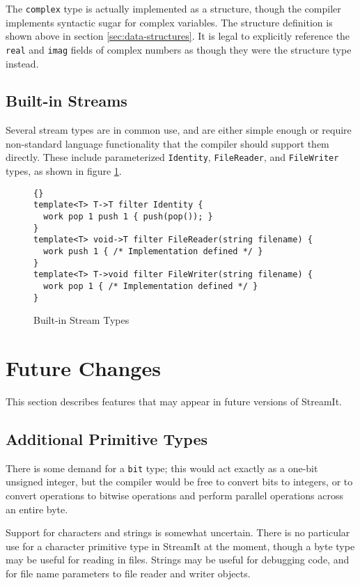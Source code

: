\documentclass[11pt]{article}
\begin{document}
The \lstinline|complex| type is actually implemented as a structure,
though the compiler implements syntactic sugar for complex variables.
The structure definition is shown above in section
\ref{sec:data-structures}.
It is legal to explicitly reference the \lstinline|real| and
\lstinline|imag| fields of complex numbers as though they were the
structure type instead.

\subsection{Built-in Streams}

Several stream types are in common use, and are either simple enough
or require non-standard language functionality that the compiler
should support them directly.  These include parameterized
\lstinline|Identity|, \lstinline|FileReader|, and \lstinline|FileWriter| types, as
shown in figure \ref{fig:built-in-streams}.

\begin{figure}[htbp]
    \begin{lstlisting}{}
template<T> T->T filter Identity {
  work pop 1 push 1 { push(pop()); }
}
template<T> void->T filter FileReader(string filename) {
  work push 1 { /* Implementation defined */ }
}
template<T> T->void filter FileWriter(string filename) {
  work pop 1 { /* Implementation defined */ }
}
\end{lstlisting}
    \caption{Built-in Stream Types}
    \label{fig:built-in-streams}
\end{figure}

\section{Future Changes}

This section describes features that may appear in future versions of
StreamIt.

\subsection{Additional Primitive Types}

There is some demand for a \lstinline|bit| type; this would act exactly
as a one-bit unsigned integer, but the compiler would be free to
convert bits to integers, or to convert operations to bitwise
operations and perform parallel operations across an entire byte.

Support for characters and strings is somewhat uncertain.  There is no
particular use for a character primitive type in StreamIt at the
moment, though a byte type may be useful for reading in files.
Strings may be useful for debugging code, and for file name parameters
to file reader and writer objects.
\end{document}
